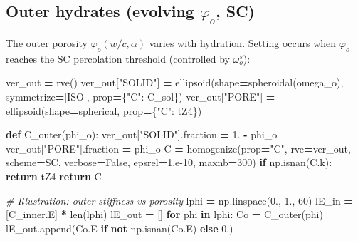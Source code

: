 \documentclass[
  a4paper,
  numbers=noendperiod,
  DIV=12]{scrreprt}
\newenvironment{Shaded}{\begin{snugshade}}{\end{snugshade}}
\newcommand{\BuiltInTok}[1]{#1}
\newcommand{\CommentTok}[1]{\textcolor[rgb]{0.56,0.35,0.01}{\textit{#1}}}
\newcommand{\ControlFlowTok}[1]{\textcolor[rgb]{0.13,0.29,0.53}{\textbf{#1}}}
\newcommand{\DecValTok}[1]{\textcolor[rgb]{0.00,0.00,0.81}{#1}}
\newcommand{\FloatTok}[1]{\textcolor[rgb]{0.00,0.00,0.81}{#1}}
\newcommand{\KeywordTok}[1]{\textcolor[rgb]{0.13,0.29,0.53}{\textbf{#1}}}
\newcommand{\NormalTok}[1]{#1}
\newcommand{\OperatorTok}[1]{\textcolor[rgb]{0.81,0.36,0.00}{\textbf{#1}}}
\newcommand{\StringTok}[1]{\textcolor[rgb]{0.31,0.60,0.02}{#1}}
\newcommand{\VariableTok}[1]{\textcolor[rgb]{0.00,0.00,0.00}{#1}}
\begin{document}
\subsection{\texorpdfstring{Outer hydrates (evolving \(\varphi_o\),
SC)}{Outer hydrates (evolving \textbackslash varphi\_o, SC)}}\label{outer-hydrates-evolving-varphi_o-sc}

The outer porosity \(\varphi_o(w/c,\alpha)\) varies with hydration.
Setting occurs when \(\varphi_o\) reaches the SC percolation threshold
(controlled by \(\omega_o^s\)):

\begin{Shaded}
\begin{Highlighting}[]
\NormalTok{ver\_out }\OperatorTok{=}\NormalTok{ rve()}
\NormalTok{ver\_out[}\StringTok{"SOLID"}\NormalTok{] }\OperatorTok{=}\NormalTok{ ellipsoid(shape}\OperatorTok{=}\NormalTok{spheroidal(omega\_o), symmetrize}\OperatorTok{=}\NormalTok{[ISO],}
\NormalTok{                              prop}\OperatorTok{=}\NormalTok{\{}\StringTok{"C"}\NormalTok{: C\_sol\})}
\NormalTok{ver\_out[}\StringTok{"PORE"}\NormalTok{]  }\OperatorTok{=}\NormalTok{ ellipsoid(shape}\OperatorTok{=}\NormalTok{spherical, prop}\OperatorTok{=}\NormalTok{\{}\StringTok{"C"}\NormalTok{: tZ4\})}

\KeywordTok{def}\NormalTok{ C\_outer(phi\_o):}
\NormalTok{    ver\_out[}\StringTok{"SOLID"}\NormalTok{].fraction }\OperatorTok{=} \FloatTok{1.} \OperatorTok{{-}}\NormalTok{ phi\_o}
\NormalTok{    ver\_out[}\StringTok{"PORE"}\NormalTok{].fraction  }\OperatorTok{=}\NormalTok{ phi\_o}
\NormalTok{    C }\OperatorTok{=}\NormalTok{ homogenize(prop}\OperatorTok{=}\StringTok{"C"}\NormalTok{, rve}\OperatorTok{=}\NormalTok{ver\_out, scheme}\OperatorTok{=}\NormalTok{SC,}
\NormalTok{                   verbose}\OperatorTok{=}\VariableTok{False}\NormalTok{, epsrel}\OperatorTok{=}\FloatTok{1.e{-}10}\NormalTok{, maxnb}\OperatorTok{=}\DecValTok{300}\NormalTok{)}
    \ControlFlowTok{if}\NormalTok{ np.isnan(C.k): }\ControlFlowTok{return}\NormalTok{ tZ4}
    \ControlFlowTok{return}\NormalTok{ C}

\CommentTok{\# Illustration: outer stiffness vs porosity}
\NormalTok{lphi }\OperatorTok{=}\NormalTok{ np.linspace(}\FloatTok{0.}\NormalTok{, }\FloatTok{1.}\NormalTok{, }\DecValTok{60}\NormalTok{)}
\NormalTok{lE\_in  }\OperatorTok{=}\NormalTok{ [C\_inner.E] }\OperatorTok{*} \BuiltInTok{len}\NormalTok{(lphi)}
\NormalTok{lE\_out }\OperatorTok{=}\NormalTok{ []}
\ControlFlowTok{for}\NormalTok{ phi }\KeywordTok{in}\NormalTok{ lphi:}
\NormalTok{    Co }\OperatorTok{=}\NormalTok{ C\_outer(phi)}
\NormalTok{    lE\_out.append(Co.E }\ControlFlowTok{if} \KeywordTok{not}\NormalTok{ np.isnan(Co.E) }\ControlFlowTok{else} \FloatTok{0.}\NormalTok{)}


\end{Highlighting}
\end{Shaded}
\end{document}

